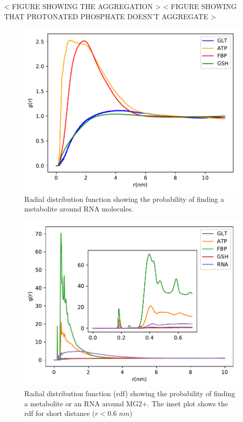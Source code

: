 \documentclass[journal=jacsat,manuscript=article]{achemso}
\begin{document}
< FIGURE SHOWING THE AGGREGATION >
< FIGURE SHOWING THAT PROTONATED PHOSPHATE DOESN'T AGGREGATE >



\begin{figure}
\includegraphics[scale=0.6]{rdf_RNA_metabolites.pdf}
\caption{Radial distribution function showing the probability of finding a metabolite around RNA molecules.}
\end{figure}

\begin{figure}
\includegraphics[scale=0.6]{rdf_mg.pdf}
\caption{Radial distribution function (rdf) showing the probability of finding a metabolite or an RNA around MG2+. The inset plot shows the rdf for short distance ($ r < 0.6 \,\, nm$)}
\end{figure}
\end{document}
